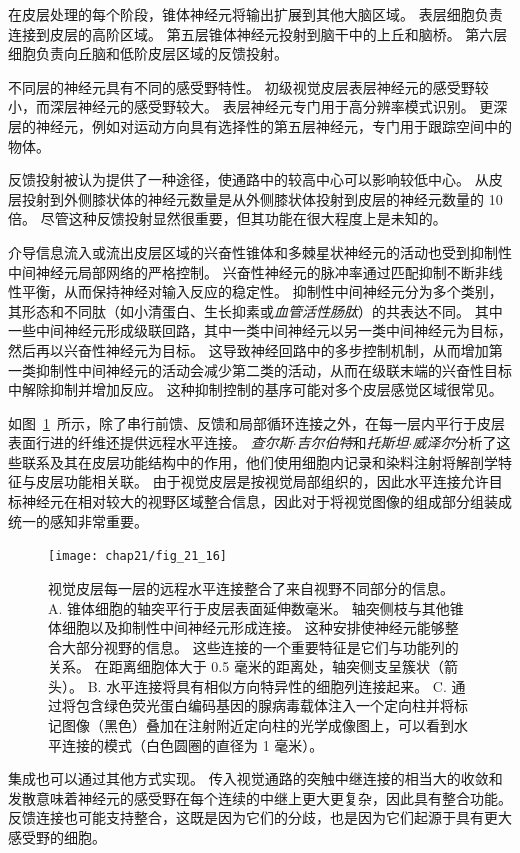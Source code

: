 在皮层处理的每个阶段，锥体神经元将输出扩展到其他大脑区域。
表层细胞负责连接到皮层的高阶区域。
第五层锥体神经元投射到脑干中的上丘和脑桥。
第六层细胞负责向丘脑和低阶皮层区域的反馈投射。


不同层的神经元具有不同的感受野特性。
初级视觉皮层表层神经元的感受野较小，而深层神经元的感受野较大。
表层神经元专门用于高分辨率模式识别。 
更深层的神经元，例如对运动方向具有选择性的第五层神经元，专门用于跟踪空间中的物体。


反馈投射被认为提供了一种途径，使通路中的较高中心可以影响较低中心。
从皮层投射到外侧膝状体的神经元数量是从外侧膝状体投射到皮层的神经元数量的 10 倍。
尽管这种反馈投射显然很重要，但其功能在很大程度上是未知的。


介导信息流入或流出皮层区域的兴奋性锥体和多棘星状神经元的活动也受到抑制性中间神经元局部网络的严格控制。
兴奋性神经元的脉冲率通过匹配抑制不断非线性平衡，从而保持神经对输入反应的稳定性。
抑制性中间神经元分为多个类别，其形态和不同肽（如小清蛋白、生长抑素或\textit{血管活性肠肽}）的共表达不同。
其中一些中间神经元形成级联回路，其中一类中间神经元以另一类中间神经元为目标，然后再以兴奋性神经元为目标。
这导致神经回路中的多步控制机制，从而增加第一类抑制性中间神经元的活动会减少第二类的活动，从而在级联末端的兴奋性目标中解除抑制并增加反应。
这种抑制控制的基序可能对多个皮层感觉区域很常见。


如图~\ref{fig:21_16}~所示，除了串行前馈、反馈和局部循环连接之外，在每一层内平行于皮层表面行进的纤维还提供远程水平连接。
\textit{查尔斯$\cdot$吉尔伯特}和\textit{托斯坦$\cdot$威泽尔}分析了这些联系及其在皮层功能结构中的作用，他们使用细胞内记录和染料注射将解剖学特征与皮层功能相关联。
由于视觉皮层是按视觉局部组织的，因此水平连接允许目标神经元在相对较大的视野区域整合信息，因此对于将视觉图像的组成部分组装成统一的感知非常重要。


\begin{figure}[htbp]
	\centering
	\texttt{[image: chap21/fig\_21\_16]}
	\caption{视觉皮层每一层的远程水平连接整合了来自视野不同部分的信息。
		A. 锥体细胞的轴突平行于皮层表面延伸数毫米。 
		轴突侧枝与其他锥体细胞以及抑制性中间神经元形成连接。
		这种安排使神经元能够整合大部分视野的信息。
		这些连接的一个重要特征是它们与功能列的关系。
		在距离细胞体大于 0.5 毫米的距离处，轴突侧支呈簇状（箭头）。
		B. 水平连接将具有相似方向特异性的细胞列连接起来。
		C. 通过将包含绿色荧光蛋白编码基因的腺病毒载体注入一个定向柱并将标记图像（黑色）叠加在注射附近定向柱的光学成像图上，可以看到水平连接的模式（白色圆圈的直径为 1 毫米）。}
	\label{fig:21_16}
\end{figure}


集成也可以通过其他方式实现。
传入视觉通路的突触中继连接的相当大的收敛和发散意味着神经元的感受野在每个连续的中继上更大更复杂，因此具有整合功能。 
反馈连接也可能支持整合，这既是因为它们的分歧，也是因为它们起源于具有更大感受野的细胞。




